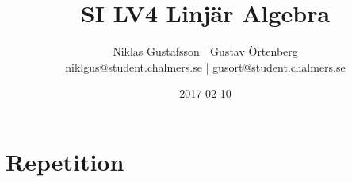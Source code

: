 \documentclass{article}
\title{SI LV4 Linjär Algebra}
\author{Niklas Gustafsson | Gustav Örtenberg  \\ \small{niklgus@student.chalmers.se} | \small{gusort@student.chalmers.se}}
\date{2017-02-10}
\begin{document}
\maketitle
\section*{Repetition}


\section{}


\section{}


\section{}


\section{}


\section{}


\section{}

\end{document}
